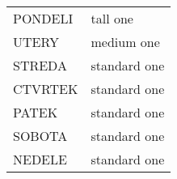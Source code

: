 \documentclass[a5paper,landscape]{scrartcl}
\begin{document}
\pagestyle{empty}

\begin{tabular}{|p{2cm}|p{5cm}|}
PONDELI & tall one\\[17mm]
UTERY & medium one\\[17mm]
STREDA & standard one\\[17mm]
CTVRTEK & standard one\\[17mm]
PATEK & standard one\\[17mm]
SOBOTA & standard one\\[17mm]
NEDELE & standard one\\[17mm]
\end{tabular}
\end{document}
